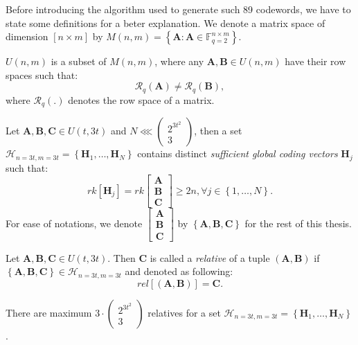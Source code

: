 Before introducing the algorithm used to generate such 89 codewords,
we have to state some definitions for a beter explanation. We denote
a matrix space of dimension $\left[n\times m\right]$ by $M(n,m)=\left\{ \boldsymbol{A}:\boldsymbol{A}\in\ensuremath{\mathbb{F}}_{q=2}^{n\times m}\right\} $.
\begin{defn}
 $U(n,m)$ is a subset of $M(n,m)$, where any $\boldsymbol{A},\boldsymbol{B}\in U(n,m)$
have their row spaces such that:
\[
\mathcal{R}_{q}\left(\boldsymbol{A}\right)\neq\mathcal{R}_{q}\left(\boldsymbol{B}\right),
\]
where $\mathcal{R}_{q}\left(.\right)$ denotes the row space of a
matrix.
\end{defn}
%
\begin{defn}
 Let $\boldsymbol{A},\boldsymbol{B},\boldsymbol{C}\in U(t,3t)$ and
$N\lll\left(\begin{array}{c}
2^{3t^{2}}\\
3
\end{array}\right)$, then a set $\mathcal{H}_{n=3t,m=3t}=\left\{ \boldsymbol{H}_{1},\ldots,\boldsymbol{H}_{N}\right\} $
contains distinct \textit{sufficient global coding vectors} $\boldsymbol{H}_{j}$
such that:
\[
rk\left[\boldsymbol{H}_{j}\right]=rk\left[\begin{array}{c}
\boldsymbol{A}\\
\boldsymbol{B}\\
\boldsymbol{C}
\end{array}\right]\geq2n,\forall j\in\left\{ 1,\ldots,N\right\} .
\]
For ease of notations, we denote $\left[\begin{array}{c}
\boldsymbol{A}\\
\boldsymbol{B}\\
\boldsymbol{C}
\end{array}\right]$ by $\left\{ \boldsymbol{A},\boldsymbol{B},\boldsymbol{C}\right\} $
for the rest of this thesis.
\end{defn}
%
\begin{defn}[Relative]
 Let $\boldsymbol{A},\boldsymbol{B},\boldsymbol{C}\in U(t,3t)$.
Then $\boldsymbol{C}$ is called a \textit{relative} of a tuple $\left(\boldsymbol{A},\boldsymbol{B}\right)$
if $\left\{ \boldsymbol{A},\boldsymbol{B},\boldsymbol{C}\right\} \in\mathcal{H}_{n=3t,m=3t}$
and denoted as following:
\[
rel\left[\left(\boldsymbol{A},\boldsymbol{B}\right)\right]=\boldsymbol{C}.
\]
\end{defn}
\begin{lem}
There are maximum $3\cdot\left(\begin{array}{c}
2^{3t^{2}}\\
3
\end{array}\right)$ relatives for a set $\mathcal{H}_{n=3t,m=3t}=\left\{ \boldsymbol{H}_{1},\ldots,\boldsymbol{H}_{N}\right\} $.
\label{lem:num_of_relatives}
\end{lem}
